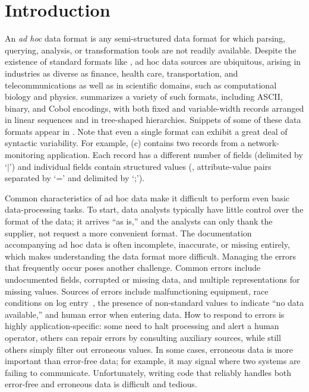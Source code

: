 \section{Introduction}
\label{sec:intro}

An {\em ad hoc} data format is any semi-structured data format for which
parsing, querying, analysis, or transformation tools are not readily
available.  Despite the existence of standard
formats like \xml{}, ad hoc data sources are ubiquitous,
arising in industries as diverse as finance, health care,
transportation, and telecommunications as well as in scientific
domains, such as computational biology and physics.
 summarizes a variety of such formats,
including ASCII, binary, and Cobol encodings, with both fixed and
variable-width records arranged in linear sequences and in tree-shaped
hierarchies.  Snippets of some of these data formats appear in .
Note that even a single format can exhibit a great deal of
syntactic variability.  For example, (c)
contains two records from a network-monitoring application.  
Each record has a different number of fields (delimited by `$|$') and
individual fields contain structured values (\eg{},
attribute-value pairs separated by `=' and delimited by `;').

Common characteristics of ad hoc data make it difficult to perform
even basic data-processing tasks.  To start, data analysts typically
have little control over the format of the data;  it
arrives ``as is,'' and the analysts can only thank the supplier,
not request a more convenient format.  The documentation accompanying
ad hoc data is often incomplete, inaccurate, or missing entirely,
which makes understanding the data format more difficult.
Managing the errors that frequently occur poses another challenge. Common errors include undocumented fields, corrupted or missing data, and multiple representations for missing values.  Sources of errors include
malfunctioning equipment, race conditions on log entry~\cite{wpp}, the
presence of non-standard values to indicate ``no data available,'' and
human error when entering data.  How to respond to errors is highly 
application-specific: some need to halt processing and
alert a human operator, others can repair errors by consulting auxiliary sources, while still others simply filter out erroneous values. In some cases, erroneous data is more important than error-free data; for example, 
it may signal where two systems are failing to communicate.
Unfortunately, writing code that reliably handles
both error-free and erroneous data is difficult and tedious.

